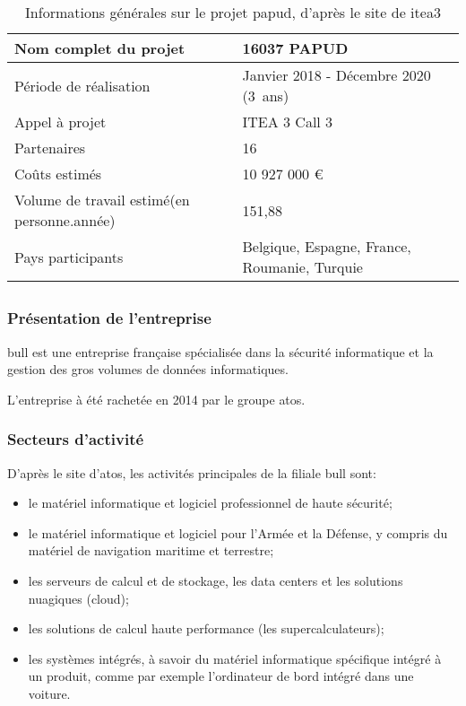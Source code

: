 \begin{table}[h]{
	\centering
	\renewcommand{\arraystretch}{1.5}
	\setlength\tabcolsep{1em}
	\begin{tabularx}{\textwidth}{|X|l|}
		\hline
		Nom complet du projet & 16037 PAPUD\\
		\hline
		Période de réalisation & Janvier 2018 - Décembre 2020 (3~ans)\\
		\hline
		Appel à projet & ITEA 3 Call 3\\
		\hline
		Partenaires & 16\\
		\hline
		Coûts estimés & 10 927 000 €\\
		\hline
		Volume de travail estimé\newline (en personne.année) & 151,88 \\
		\hline
		Pays participants & Belgique, Espagne, France, \mbox{Roumanie}, Turquie\\
		\hline
	\end{tabularx}
	\renewcommand{\arraystretch}{1}}
	\caption{Informations générales sur le projet \gls{papud}, d'après le site de \gls{itea3} \autocite{about_papud} \label{tab:about_papud}}
\end{table}

\subsection{}
\subsubsection*{Présentation de l'entreprise}
\gls{bull} est une entreprise française spécialisée dans la sécurité informatique et la gestion des gros volumes de données informatiques. 

L'entreprise à été rachetée en 2014 par le groupe \gls{atos}.

\subsubsection*{Secteurs d'activité}
D'après {le site d'\gls{atos}\autocite{bull_produits}}, les activités principales de la filiale \gls{bull} sont:
\begin{itemize}
	\item le matériel informatique et logiciel professionnel de haute sécurité;
	\item le matériel informatique et logiciel pour l'Armée et la Défense, y compris du matériel de navigation maritime et terrestre;
	\item les serveurs de calcul et de stockage, les \gls{data centers} et les solutions nuagiques (\gls{cloud}); %
	\item les solutions de calcul haute performance (les \og supercalculateurs\fg{});
	\item les systèmes intégrés, à savoir du matériel informatique spécifique intégré à un produit, comme par exemple l'ordinateur de bord intégré dans une voiture.
\end{itemize}
\vspace{1em}

